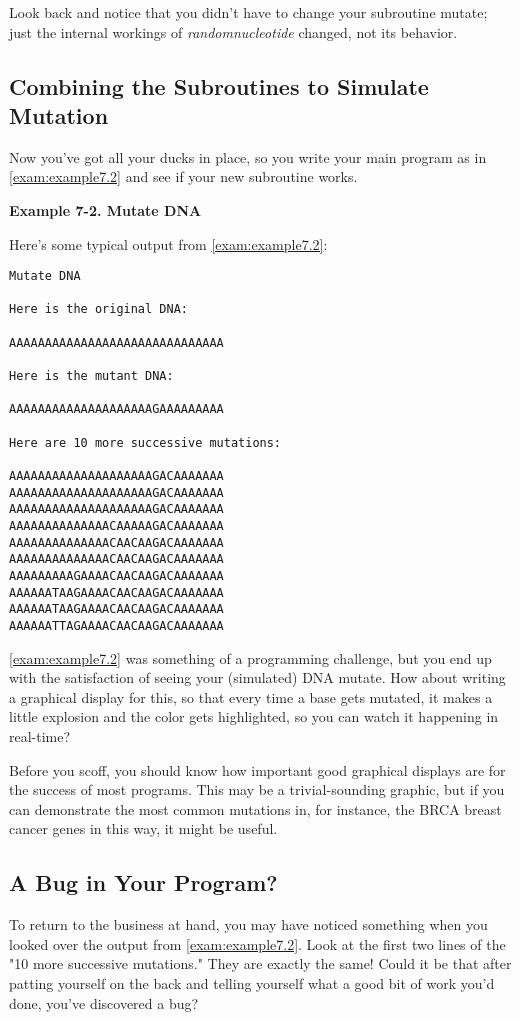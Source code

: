 Look back and notice that you didn't have to change your subroutine mutate; just the internal workings of \textit{randomnucleotide} changed, not its behavior. 

\subsection{Combining the Subroutines to Simulate Mutation}
Now you've got all your ducks in place, so you write your main program as in \autoref{exam:example7.2} and see if your new subroutine works.

\textbf{Example 7-2. Mutate DNA}


Here's some typical output from \autoref{exam:example7.2}:

\begin{lstlisting}
Mutate DNA

Here is the original DNA:

AAAAAAAAAAAAAAAAAAAAAAAAAAAAAA

Here is the mutant DNA:

AAAAAAAAAAAAAAAAAAAAGAAAAAAAAA

Here are 10 more successive mutations:

AAAAAAAAAAAAAAAAAAAAGACAAAAAAA
AAAAAAAAAAAAAAAAAAAAGACAAAAAAA
AAAAAAAAAAAAAAAAAAAAGACAAAAAAA
AAAAAAAAAAAAAACAAAAAGACAAAAAAA
AAAAAAAAAAAAAACAACAAGACAAAAAAA
AAAAAAAAAAAAAACAACAAGACAAAAAAA
AAAAAAAAAGAAAACAACAAGACAAAAAAA
AAAAAATAAGAAAACAACAAGACAAAAAAA
AAAAAATAAGAAAACAACAAGACAAAAAAA
AAAAAATTAGAAAACAACAAGACAAAAAAA
\end{lstlisting}

\autoref{exam:example7.2} was something of a programming challenge, but you end up with the satisfaction of seeing your (simulated) DNA mutate. How about writing a graphical display for this, so that every time a base gets mutated, it makes a little explosion and the color gets highlighted, so you can watch it happening in real-time?

Before you scoff, you should know how important good graphical displays are for the success of most programs. This may be a trivial-sounding graphic, but if you can demonstrate the most common mutations in, for instance, the BRCA breast cancer genes in this way, it might be useful. 

\subsection{A Bug in Your Program?}
To return to the business at hand, you may have noticed something when you looked over the output from \autoref{exam:example7.2}. Look at the first two lines of the "10 more successive mutations." They are exactly the same! Could it be that after patting yourself on the back and telling yourself what a good bit of work you'd done, you've discovered a bug?

